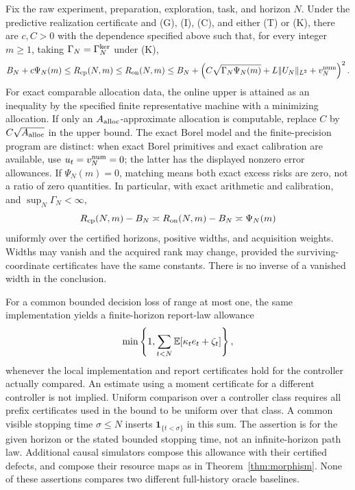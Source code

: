 \begin{theorem}\label{thm:main}
Fix the raw experiment, preparation, exploration, task, and horizon $N$. Under the predictive realization certificate and \textup{(G), (I), (C)}, and either \textup{(T)} or \textup{(K)}, there are $c,C>0$ with the dependence specified above such that, for every integer $m\ge1$, taking $\Gamma_N=\Gamma_N^{\rm ker}$ under \textup{(K)},
\begin{equation}\label{eq:main}
 B_N+c\Psi_N(m)\le R_{\mathrm{cp}}(N,m)\le R_{\mathrm{on}}(N,m)
 \le B_N+\left(C\sqrt{\Gamma_N\Psi_N(m)}
             +L\lVert U_N\rVert_{L^2}+v_N^{\rm num}\right)^2.
\end{equation}
For exact comparable allocation data, the online upper is attained as an inequality by the specified finite representative machine with a minimizing allocation. If only an $A_{\rm alloc}$-approximate allocation is computable, replace $C$ by $C\sqrt{A_{\rm alloc}}$ in the upper bound. The exact Borel model and the finite-precision program are distinct: when exact Borel primitives and exact calibration are available, use $u_t=v_N^{\rm num}=0$; the latter has the displayed nonzero error allowances. If $\Psi_N(m)=0$, matching means both exact excess risks are zero, not a ratio of zero quantities. In particular, with exact arithmetic and calibration, and $\sup_N\Gamma_N<\infty$,
\begin{equation}\label{eq:matching}
 R_{\mathrm{cp}}(N,m)-B_N\asymp R_{\mathrm{on}}(N,m)-B_N\asymp\Psi_N(m)
\end{equation}
uniformly over the certified horizons, positive widths, and acquisition weights. Widths may vanish and the acquired rank may change, provided the surviving-coordinate certificates have the same constants. There is no inverse of a vanished width in the conclusion.

For a common bounded decision loss of range at most one, the same implementation yields a finite-horizon report-law allowance
\begin{equation}\label{eq:pathallowance}
 \min\left\{1,\sum_{t<N}\mathbb E[\kappa_t e_t+\zeta_t]\right\},
\end{equation}
whenever the local implementation and report certificates hold for the controller actually compared. An estimate using a moment certificate for a different controller is not implied. Uniform comparison over a controller class requires all prefix certificates used in the bound to be uniform over that class. A common visible stopping time $\sigma\le N$ inserts $\mathbf1_{\{t<\sigma\}}$ in this sum. The assertion is for the given horizon or the stated bounded stopping time, not an infinite-horizon path law. Additional causal simulators compose this allowance with their certified defects, and compose their resource maps as in Theorem~\ref{thm:morphism}. None of these assertions compares two different full-history oracle baselines.
\end{theorem}

